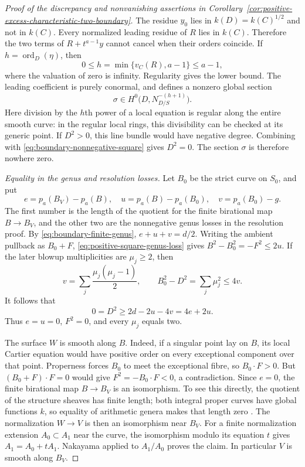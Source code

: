 \begin{proof}[Proof of the discrepancy and nonvanishing assertions in Corollary~\ref{cor:positive-excess-characteristic-two-boundary}]
The residue $y_0$ lies in $k(D)=k(C)^{1/2}$ and not in $k(C)$.
Every normalized leading residue of $R$ lies in $k(C)$.
Therefore the two terms of $R+t^{a-1}y$ cannot cancel when
their orders coincide. If $h=\operatorname{ord}_D(\eta)$, then
\begin{equation}\label{eq:boundary-conormal-order}
 0\leq h=\min\{v_C(R),a-1\}\leq a-1,
\end{equation}
where the valuation of zero is infinity. Regularity gives the
lower bound. The leading coefficient is purely conormal, and
defines a nonzero global section
\begin{equation}\label{eq:boundary-conormal-section}
 \sigma\in H^0\bigl(D,N_{D/S}^{-(h+1)}\bigr).
\end{equation}
Here division by the $h$th power of a local equation is regular
along the entire smooth curve: in the regular local rings, this
divisibility can be checked at its generic point.
If $D^2>0$, this line bundle would have negative degree.
Combining with \eqref{eq:boundary-nonnegative-square} gives
$D^2=0$. The section $\sigma$ is therefore nowhere zero.

\smallskip\noindent
\emph{Equality in the genus and resolution losses.}
Let $B_0$ be the strict curve on $S_0$, and put
\[
 e=p_a(B_V)-p_a(B),\quad
 u=p_a(B)-p_a(B_0),\quad
 v=p_a(B_0)-g.
\]
The first number is the length of the quotient for the finite
birational map $B\to B_V$, and the other two are the
nonnegative genus losses in the resolution proof.
By \eqref{eq:boundary-finite-genus}, $e+u+v=d/2$.
Writing the ambient pullback as $B_0+F$,
\eqref{eq:positive-square-genus-loss} gives
$B^2-B_0^2=-F^2\leq2u$.
If the later blowup multiplicities are $\mu_j\geq2$, then
\[
 v=\sum_j\frac{\mu_j(\mu_j-1)}2,
 \qquad B_0^2-D^2=\sum_j\mu_j^2\leq4v.
\]
It follows that
\[
 0=D^2\geq2d-2u-4v=4e+2u.
\]
Thus $e=u=0$, $F^2=0$, and every $\mu_j$ equals two.

The surface $W$ is smooth along $B$. Indeed, if a singular
point lay on $B$, its local Cartier equation would have positive
order on every exceptional component over that point. Properness
forces $B_0$ to meet the exceptional fibre, so $B_0\cdot F>0$.
But $(B_0+F)\cdot F=0$ would give $F^2=-B_0\cdot F<0$,
a contradiction.
Since $e=0$, the finite birational map $B\to B_V$ is an
isomorphism. To see this directly, the quotient of the structure
sheaves has finite length; both integral proper curves have global
functions $k$, so equality of arithmetic genera makes that length
zero \cite[Tag~0CE4]{Stacks}.
The normalization $W\to V$ is then an isomorphism near $B_V$.
For a finite normalization extension $A_0\subset A_1$ near the
curve, the isomorphism modulo its equation $t$ gives
$A_1=A_0+tA_1$. Nakayama applied to $A_1/A_0$ proves the
claim. In particular $V$ is smooth along $B_V$.


\end{proof}
